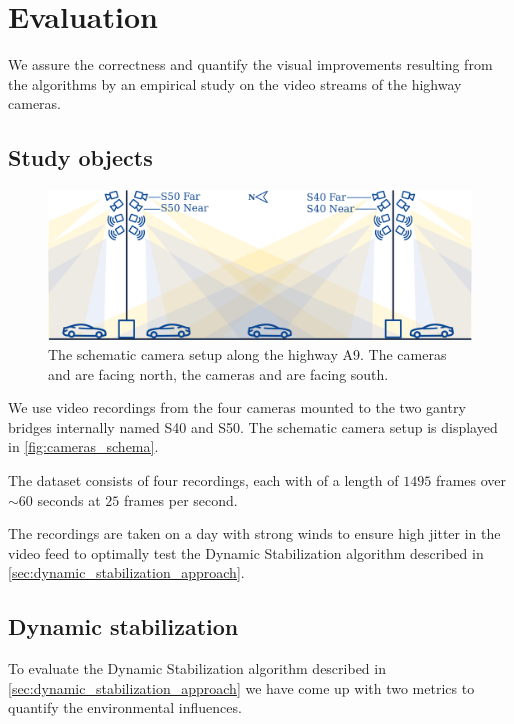 
\section{Evaluation}

We assure the correctness and quantify the visual improvements resulting from the algorithms by an empirical study on the video streams of the highway cameras.

\subsection{Study objects}
\begin{figure}[t]
    \begin{center}
       \includegraphics[width=\linewidth]{images/cameras_schema.png}
    \end{center}
       \caption{The schematic camera setup along the highway A9.
       The cameras  and  are facing north,
       the cameras  and  are facing south.}
    \label{fig:cameras_schema}
    \end{figure}

We use video recordings from the four cameras mounted to the two gantry bridges internally named S40 and S50. The schematic camera setup is displayed in \autoref{fig:cameras_schema}.

The dataset consists of four recordings, each with of a length of $1495$ frames over $\sim 60$ seconds at $25$ frames per second.

The recordings are taken on a day with strong winds to ensure high jitter in the video feed to optimally test the Dynamic Stabilization algorithm described in \autoref{sec:dynamic_stabilization_approach}. 

\subsection{Dynamic stabilization}
\label{sec:evaluation_dynamic_stabilization}
To evaluate the Dynamic Stabilization algorithm described in \autoref{sec:dynamic_stabilization_approach} we have come up with two metrics to quantify the environmental influences.

